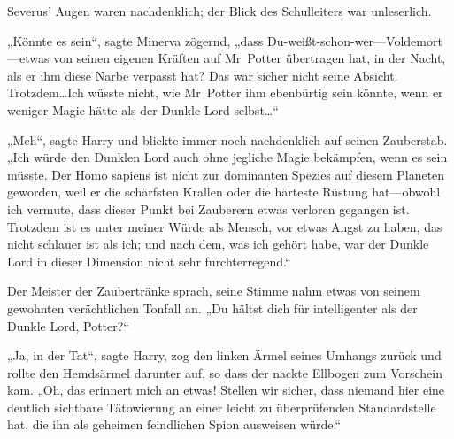 Severus' Augen waren nachdenklich; der Blick des Schulleiters war unleserlich.

„Könnte es sein“, sagte Minerva zögernd, „dass Du-weißt-schon-wer—Voldemort—etwas von seinen eigenen Kräften auf Mr~Potter übertragen hat, in der Nacht, als er ihm diese Narbe verpasst hat? Das war sicher nicht seine Absicht. Trotzdem…Ich wüsste nicht, wie Mr~Potter ihm ebenbürtig sein könnte, wenn er weniger Magie hätte als der Dunkle Lord selbst…“

„Meh“, sagte Harry und blickte immer noch nachdenklich auf seinen Zauberstab. „Ich würde den Dunklen Lord auch ohne jegliche Magie bekämpfen, wenn es sein müsste. Der Homo sapiens ist nicht zur dominanten Spezies auf diesem Planeten geworden, weil er die schärfsten Krallen oder die härteste Rüstung hat—obwohl ich vermute, dass dieser Punkt bei Zauberern etwas verloren gegangen ist. Trotzdem ist es unter meiner Würde als Mensch, vor etwas Angst zu haben, das nicht schlauer ist als ich; und nach dem, was ich gehört habe, war der Dunkle Lord in dieser Dimension nicht sehr furchterregend.“

Der Meister der Zaubertränke sprach, seine Stimme nahm etwas von seinem gewohnten verächtlichen Tonfall an. „Du hältst dich für intelligenter als der Dunkle Lord, Potter?“

„Ja, in der Tat“, sagte Harry, zog den linken Ärmel seines Umhangs zurück und rollte den Hemdsärmel darunter auf, so dass der nackte Ellbogen zum Vorschein kam. „Oh, das erinnert mich an etwas! Stellen wir sicher, dass niemand hier eine deutlich sichtbare Tätowierung an einer leicht zu überprüfenden Standardstelle hat, die ihn als geheimen feindlichen Spion ausweisen würde.“

